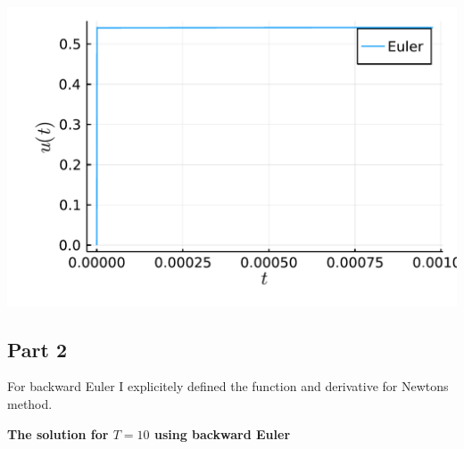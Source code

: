 \documentclass[12pt,a4paper]{article}
\begin{document}
\includegraphics[width=\linewidth]{figures/ass_1_report_7_1.pdf}

\subsection{Part 2}
For backward Euler I explicitely defined the function and derivative for Newtons method.

\textbf{The solution for $T=10$ using backward Euler}
\end{document}
